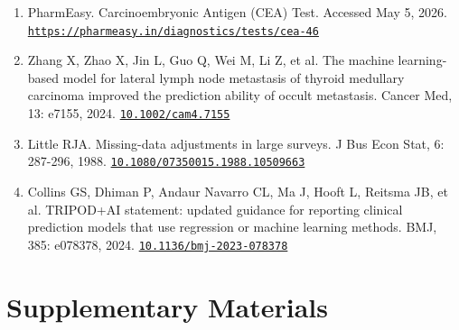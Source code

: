 \documentclass[12pt]{article}
\newcommand{\doi}[1]{\href{https://doi.org/#1}{\nolinkurl{#1}}}
\newcommand{\weblink}[1]{\href{#1}{\nolinkurl{#1}}}
\begin{document}
\begin{enumerate}
\item PharmEasy. Carcinoembryonic Antigen (CEA) Test. Accessed May 5, 2026. \weblink{https://pharmeasy.in/diagnostics/tests/cea-46}
\item Zhang X, Zhao X, Jin L, Guo Q, Wei M, Li Z, et al. The machine learning-based model for lateral lymph node metastasis of thyroid medullary carcinoma improved the prediction ability of occult metastasis. Cancer Med, 13: e7155, 2024. \doi{10.1002/cam4.7155}
\item Little RJA. Missing-data adjustments in large surveys. J Bus Econ Stat, 6: 287-296, 1988. \doi{10.1080/07350015.1988.10509663}
\item Collins GS, Dhiman P, Andaur Navarro CL, Ma J, Hooft L, Reitsma JB, et al. TRIPOD+AI statement: updated guidance for reporting clinical prediction models that use regression or machine learning methods. BMJ, 385: e078378, 2024. \doi{10.1136/bmj-2023-078378}
\end{enumerate}

\clearpage
\appendix
\section{Supplementary Materials}

\end{document}
